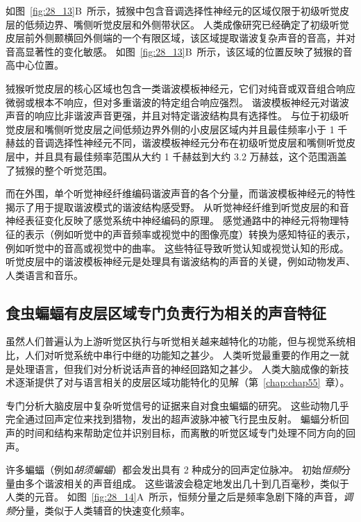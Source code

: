 如图~\ref{fig:28_13}B~所示，狨猴中包含音调选择性神经元的区域仅限于初级听觉皮层的低频边界、嘴侧听觉皮层和外侧带状区。
人类成像研究已经确定了初级听觉皮层前外侧颞横回外侧端的一个有限区域，该区域提取谐波复杂声音的音高，并对音高显著性的变化敏感。
如图~\ref{fig:28_13}B~所示，该区域的位置反映了狨猴的音高中心位置。


狨猴听觉皮层的核心区域也包含一类谐波模板神经元，它们对纯音或双音组合响应微弱或根本不响应，但对多重谐波的特定组合响应强烈。
谐波模板神经元对谐波声音的响应比非谐波声音更强，并且对特定谐波结构具有选择性。
与位于初级听觉皮层和嘴侧听觉皮层之间低频边界外侧的小皮层区域内并且最佳频率小于 1 千赫兹的音调选择性神经元不同，谐波模板神经元分布在初级听觉皮层和嘴侧听觉皮层中，并且具有最佳频率范围从大约 1 千赫兹到大约 3.2 万赫兹，这个范围涵盖了狨猴的整个听觉范围。


而在外围，单个听觉神经纤维编码谐波声音的各个分量，而谐波模板神经元的特性揭示了用于提取谐波模式的谐波结构感受野。
从听觉神经纤维到听觉皮层的和音神经表征变化反映了感觉系统中神经编码的原理。
感觉通路中的神经元将物理特征的表示（例如听觉中的声音频率或视觉中的图像亮度）转换为感知特征的表示，例如听觉中的音高或视觉中的曲率。
这些特征导致听觉认知或视觉认知的形成。
听觉皮层中的谐波模板神经元是处理具有谐波结构的声音的关键，例如动物发声、人类语言和音乐。



\subsection{食虫蝙蝠有皮层区域专门负责行为相关的声音特征}

虽然人们普遍认为上游听觉区执行与听觉相关越来越特化的功能，但与视觉系统相比，人们对听觉系统中串行中继的功能知之甚少。
人类听觉最重要的作用之一就是处理语言，但我们对分析说话声音的神经回路知之甚少。
人类大脑成像的新技术逐渐提供了对与语言相关的皮层区域功能特化的见解（第~\ref{chap:chap55}~章）。


专门分析大脑皮层中复杂听觉信号的证据来自对食虫蝙蝠的研究。
这些动物几乎完全通过回声定位来找到猎物，发出的超声波脉冲被飞行昆虫反射。
蝙蝠分析回声的时间和结构来帮助定位并识别目标，而离散的听觉区域专门处理不同方向的回声。


许多蝙蝠（例如\textit{胡须蝙蝠}）都会发出具有 2 种成分的回声定位脉冲\cite{suga1983specificity,suga1984neural}。
初始\emph{恒频}分量由多个谐波相关的声音组成。 %
这些谐波会稳定地发出几十到几百毫秒，类似于人类的元音。
如图~\ref{fig:28_14}A~所示，恒频分量之后是频率急剧下降的声音，\textit{调频}分量，类似于人类辅音的快速变化频率。


